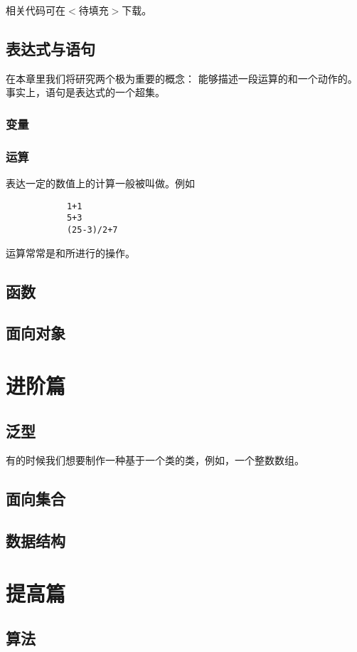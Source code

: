 \documentclass[a4paper]{tufte-book}
\begin{document}
		相关代码可在$<$待填充$>$下载。
		
	\chapter{表达式与语句}
		在本章里我们将研究两个极为重要的概念：
		能够描述一段运算的和一个动作的。
		事实上，语句是表达式的一个超集。
		\section{变量}
			
		\section{运算}
			表达一定的数值上的计算一般被叫做。例如
			\begin{verbatim}
			1+1
			5+3
			(25-3)/2+7
			\end{verbatim}
			运算常常是和所进行的操作。
			
	\chapter{函数}
	\chapter{面向对象}
	
\part{进阶篇}
	\chapter{泛型}
		有的时候我们想要制作一种基于一个类的类，例如，一个整数数组。
		
	\chapter{面向集合}
	\chapter{数据结构}
	
\part{提高篇}
	\chapter{算法}
\end{document}
